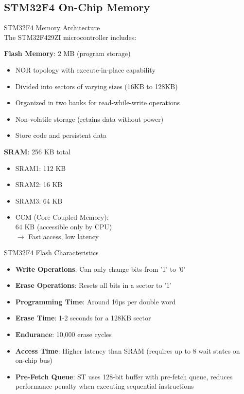 \raggedcolumns
\columnbreak

\subsection{STM32F4 On-Chip Memory}

\begin{concept}{STM32F4 Memory Architecture}\\
The STM32F429ZI microcontroller includes:

\begin{minipage}{0.65\linewidth}
\textbf{Flash Memory}: 2 MB (program storage)
    \begin{itemize}
        \item NOR topology with execute-in-place capability
        \item Divided into sectors of varying sizes (16KB to 128KB)
        \item Organized in two banks for read-while-write operations
        \item Non-volatile storage (retains data without power)
        \item Store code and persistent data
    \end{itemize}
\end{minipage}
\begin{minipage}{0.35\linewidth}
\textbf{SRAM}: 256 KB total
    \begin{itemize}
        \item SRAM1: 112 KB
        \item SRAM2: 16 KB
        \item SRAM3: 64 KB
        \item CCM (Core Coupled Memory): \\ 64 KB (accessible only by CPU)
        \\ $\rightarrow$ Fast access, low latency
    \end{itemize}
\end{minipage}
\end{concept}

\begin{definition}{STM32F4 Flash Characteristics}
\begin{itemize}
    \item \textbf{Write Operations}: Can only change bits from '1' to '0'
    \item \textbf{Erase Operations}: Resets all bits in a sector to '1'
    \item \textbf{Programming Time}: Around 16µs per double word
    \item \textbf{Erase Time}: 1-2 seconds for a 128KB sector
    \item \textbf{Endurance}: 10,000 erase cycles
    \item \textbf{Access Time}: Higher latency than SRAM (requires up to 8 wait states on on-chip bus)
    \item \textbf{Pre-Fetch Queue}: ST uses 128-bit buffer with pre-fetch queue, reduces performance penalty when executing sequential instructions
\end{itemize}
\end{definition}

